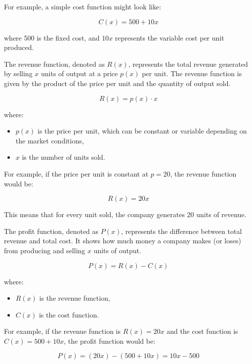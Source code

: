 For example, a simple cost function might look like:

\[
C(x) = 500 + 10x
\]

where 500 is the fixed cost, and \( 10x \) represents the variable cost per unit produced.

\begin{definition}

The revenue function, denoted as \( R(x) \), represents the total revenue generated by selling \( x \) units of output at a price \( p(x) \) per unit. The revenue function is given by the product of the price per unit and the quantity of output sold.

\[
R(x) = p(x) \cdot x
\]

where:
\begin{itemize}
\item \( p(x) \) is the price per unit, which can be constant or variable depending on the market conditions,
\item \( x \) is the number of units sold.
\end{itemize}

\end{definition}

For example, if the price per unit is constant at \( p = 20 \), the revenue function would be:

\[
R(x) = 20x
\]

This means that for every unit sold, the company generates 20 units of revenue.

\begin{definition}


The profit function, denoted as \( P(x) \), represents the difference between total revenue and total cost. It shows how much money a company makes (or loses) from producing and selling \( x \) units of output.

\[
P(x) = R(x) - C(x)
\]

where:
\begin{itemize}
\item \( R(x) \) is the revenue function,
\item \( C(x) \) is the cost function.
\end{itemize}
\end{definition}

For example, if the revenue function is \( R(x) = 20x \) and the cost function is \( C(x) = 500 + 10x \), the profit function would be:

\[
P(x) = (20x) - (500 + 10x) = 10x - 500
\]

